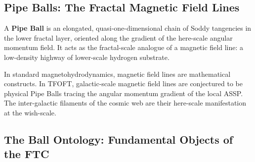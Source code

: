 \documentclass[11pt,a4paper]{article}
\begin{document}
\subsection{Pipe Balls: The Fractal Magnetic Field Lines}

A \textbf{Pipe Ball} is an elongated, quasi-one-dimensional chain of Soddy tangencies in the lower fractal layer, oriented along the gradient of the here-scale angular momentum field. It acts as the fractal-scale analogue of a magnetic field line: a low-density highway of lower-scale hydrogen substrate.

In standard magnetohydrodynamics, magnetic field lines are mathematical constructs. In TFOFT, galactic-scale magnetic field lines are conjectured to be physical Pipe Balls tracing the angular momentum gradient of the local ASSP. The inter-galactic filaments of the cosmic web are their here-scale manifestation at the wish-scale.

\subsection{The Ball Ontology: Fundamental Objects of the FTC}
\end{document}
